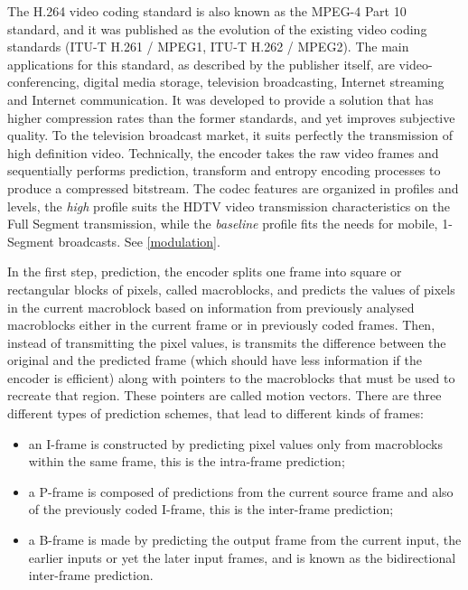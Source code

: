 \documentclass[
	12pt,				%
	openright,			%
	twoside,			%
	a4paper,			%
	brazil,
	french,				%
	english
	]{abntex2}
\begin{document}
The H.264 video coding standard is also known as the MPEG-4 Part 10 standard, and it was published as the evolution of the existing video coding standards (ITU-T H.261 / MPEG1, ITU-T H.262 / MPEG2). The main applications for this standard, as described by the publisher itself, are video-conferencing, digital  media storage, television broadcasting, Internet streaming and Internet communication. It was developed to provide a solution that has higher compression rates than the former standards, and yet improves subjective quality. To the television broadcast market, it suits perfectly the transmission of high definition video. Technically, the encoder takes the raw video frames and sequentially performs prediction, transform and entropy encoding processes to produce a compressed bitstream. The codec features are organized in profiles and levels, the \textit{high} profile suits the HDTV video transmission characteristics on the Full Segment transmission, while the \textit{baseline} profile fits the needs for mobile, 1-Segment broadcasts. See \autoref{modulation}.


In the first step, prediction, the encoder splits one frame into square or rectangular blocks of pixels, called macroblocks, and predicts the values of pixels in the current macroblock based on information from previously analysed macroblocks either in the current frame or in previously coded frames. Then, instead of transmitting the pixel values, is transmits the difference between the original and the predicted frame (which should have less information if the encoder is efficient) along with pointers to the macroblocks that must be used to recreate that region. These pointers are called motion vectors. There are three different types of prediction schemes, that lead to different kinds of frames:

\begin{itemize}
\item{an I-frame is constructed by predicting pixel values only from macroblocks within the same frame, this is the intra-frame prediction;}
\item{a P-frame is composed of predictions from the current source frame and also of the previously coded I-frame, this is the inter-frame prediction;}
\item{a B-frame is made by predicting the output frame from the current input, the earlier inputs or yet the later input frames, and is known as the bidirectional inter-frame prediction.}
\end{itemize}
\end{document}
